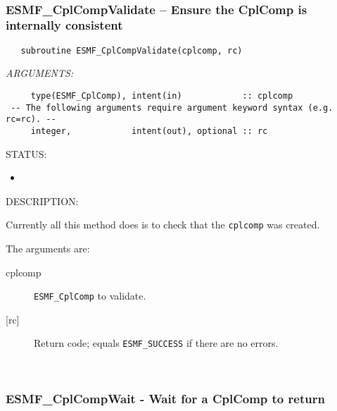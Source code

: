  
\mbox{}\hrulefill\ 
 
\subsubsection [ESMF\_CplCompValidate] {ESMF\_CplCompValidate -- Ensure the CplComp is internally consistent}


  
\begin{verbatim}   subroutine ESMF_CplCompValidate(cplcomp, rc)\end{verbatim}{\em ARGUMENTS:}
\begin{verbatim}     type(ESMF_CplComp), intent(in)            :: cplcomp
 -- The following arguments require argument keyword syntax (e.g. rc=rc). --
     integer,            intent(out), optional :: rc\end{verbatim}
{\sf STATUS:}
   \begin{itemize}
   \item{}
   \end{itemize}
  
{\sf DESCRIPTION:\\ }


   Currently all this method does is to check that the {\tt cplcomp}
   was created.
  
   The arguments are:
   \begin{description}
   \item[cplcomp]
     {\tt ESMF\_CplComp} to validate.
   \item[{[rc]}]
     Return code; equals {\tt ESMF\_SUCCESS} if there are no errors.
   \end{description}
   
 
\mbox{}\hrulefill\ 
 
\subsubsection [ESMF\_CplCompWait] {ESMF\_CplCompWait - Wait for a CplComp to return}


